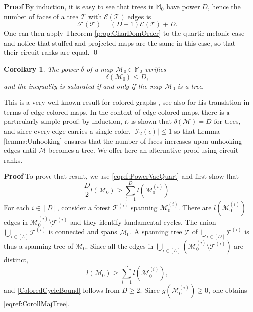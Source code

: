 \documentclass[aps,prd,10pt,notitlepage,nofootinbib,superscriptaddress,showkeys,showpacs]{revtex4-1}
\newtheorem{coroll}{Corollary}
\begin{document}
{{\noindent \bf Proof\; \; }} By induction, it is easy to see that trees in ${\mathbb{M}}_0$ have power $D$, hence the number of faces of a tree ${\mathcal{T}}$ with ${\mathcal{E}}({\mathcal{T}})$ edges is
\begin{equation}
{\mathcal{F}}({\mathcal{T}}) = (D-1){\mathcal{E}}({\mathcal{T}}) + D.
\end{equation}
One can then apply Theorem \ref{prop:CharDomOrder} to the quartic melonic case and notice that stuffed and projected maps are the same in this case, so that their circuit ranks are equal.
\qed

\begin{coroll}
\label{coroll:CorollMajTree}
The power $\delta$ of a map ${\mathcal{M}}_0\in{\mathbb{M}}_0$ verifies
\begin{equation}
\label{eqref:CorollMajTree}
\delta({\mathcal{M}}_0)\le D,
\end{equation}
and the inequality is saturated if and only if the map ${\mathcal{M}}_0$ is a tree.
\end{coroll}
 
This is a very well-known result for colored graphs \cite{Uncolored}, see also \cite{DSDartois, BeyondPert} for his translation in terms of edge-colored maps. In the context of edge-colored maps, there is a particularly simple proof: by induction, it is shown that $\delta({\mathcal{M}})=D$ for trees, and since every edge carries a single color, $|{\mathcal{I}}_2(e)| \leq 1$ so that Lemma \ref{lemma:Unhooking} ensures that the number of faces increases upon unhooking edges until ${\mathcal{M}}$ becomes a tree. We offer here an alternative proof using circuit ranks.

{{\noindent \bf Proof\; \; }} To prove that result, we use \eqref{eqref:PowerVacQuart} and first show that
\begin{equation} \label{ColoredCycleBound}
\frac{D}{2}l({\mathcal{M}}_0)\ge\sum_{i=1}^Dl({\mathcal{M}}_0^{(i)}).
\end{equation}
For each $i\in[D]$, consider a forest ${\mathcal{T}}^{(i)}$ spanning ${\mathcal{M}}_0^{(i)}$. There are $l({\mathcal{M}}_0^{(i)})$ edges in ${\mathcal{M}}^{(i)}_0\setminus {\mathcal{T}}^{(i)}$ and they identify fundamental cycles. The union $\bigcup_{i\in[D]} {\mathcal{T}}^{(i)}$ is connected and spans ${\mathcal{M}}_0$. A spanning tree ${\mathcal{T}}$ of $\bigcup_{i\in[D]} {\mathcal{T}}^{(i)}$ is thus a spanning tree of ${\mathcal{M}}_0$. Since all the edges in $\bigcup_{i\in[D]} ({\mathcal{M}}_0^{(i)}\setminus {\mathcal{T}}^{(i)})$ are distinct, 
\begin{equation}
l({\mathcal{M}}_0)\ge\sum_{i=1}^Dl({\mathcal{M}}_0^{(i)}),
\end{equation}
and \eqref{ColoredCycleBound} follows from $D\ge2$. Since $g({\mathcal{M}}_0^{(i)})\ge0$, one obtains \eqref{eqref:CorollMajTree}. 
\end{document}
